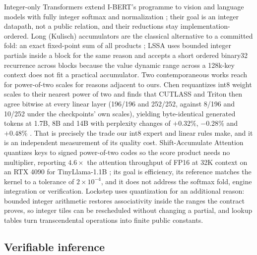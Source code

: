 \documentclass{article}
\begin{document}
Integer-only Transformers extend I-BERT's programme to vision and language models with
fully integer softmax and normalization \cite{ivit2023,illm2024}; their goal is an
integer datapath, not a public relation, and their reductions stay implementation-ordered.
Long (Kulisch) accumulators are the classical alternative to a committed fold: an exact
fixed-point sum of all products \cite{kulisch2013}; LSSA uses bounded integer partials
inside a block for the same reason and accepts a short ordered binary32 recurrence across
blocks because the value dynamic range across a 128k-key context does not fit a practical
accumulator.  Two contemporaneous works reach for power-of-two scales for reasons adjacent to
ours.  Chen
requantizes int8 weight scales to their nearest power of two and finds that CUTLASS and
Triton then agree bitwise at every linear layer (196/196 and 252/252, against 8/196 and
10/252 under the checkpoints' own scales), yielding byte-identical generated tokens at 1.7B,
8B and 14B with perplexity changes of $+0.32\%$, $-0.28\%$ and $+0.48\%$
\cite{chen2026pow2}.  That is precisely the trade our int8 expert and linear rules make, and
it is an independent measurement of its quality cost.  Shift-Accumulate Attention quantizes
keys to signed power-of-two codes so the score product needs no multiplier, reporting
$4.6\times$ the attention throughput of FP16 at 32K context on an RTX 4090 for
TinyLlama-1.1B \cite{ahmed2026shiftacc}; its goal is efficiency, its reference matches the
kernel to a tolerance of $2\times10^{-4}$, and it does not address the softmax fold, engine
integration or verification.  Lockstep uses quantization for an additional reason: bounded
integer arithmetic restores associativity inside the ranges the contract proves, so integer
tiles can be rescheduled without changing a partial, and lookup tables turn transcendental
operations into finite public constants.

\subsection{Verifiable inference}
\end{document}
